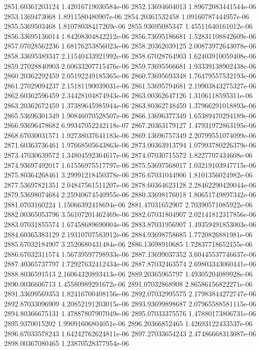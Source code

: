 {2851.60361203124 1.42016719030584e-06
2852.13694604013 1.89672083441544e-06
2853.1369473068 1.8911580480907e-06
2854.20361532458 1.09160787444957e-06
2855.5369503468 1.81078038417269e-06
2855.93695085347 1.45511640161012e-06
2856.33695136014 1.84208304842212e-06
2856.73695186681 1.52831108842609e-06
2857.07028562236 1.68176253856023e-06
2858.20362039125 2.00873972643078e-06
2858.33695389347 2.11540433921992e-06
2858.67028764903 1.62403910059408e-06
2859.27028840903 2.60633207715476e-06
2859.73695566681 1.93339138902438e-06
2860.20362292459 2.05192249185365e-06
2860.73695693348 1.76479557532193e-06
2861.27029094237 2.15181190039031e-06
2861.53695794681 2.19903843275327e-06
2862.60362596459 2.34428104874943e-06
2863.00362647126 1.3106118595311e-06
2863.20362672459 1.37389645985944e-06
2863.80362748459 1.37966291018893e-06
2865.53696301349 1.90846070528507e-06
2866.13696377349 1.65389470294189e-06
2866.93696478682 6.99347052242118e-07
2867.20363179127 1.47931972863195e-06
2868.67030031571 1.92738037641183e-06
2869.13696757349 2.20799551074099e-06
2871.60363736461 1.97668505643863e-06
2873.00363913794 1.07993780226379e-06
2873.47030639572 1.34804592364617e-06
2874.07030715572 1.8227707434608e-06
2874.93697492017 1.61556975517797e-06
2875.53697568017 1.03219103947715e-06
2875.80364268461 3.29991218450378e-06
2876.67031044906 1.8101356024982e-06
2877.53697821351 2.04847561511207e-06
2878.60364623128 2.28462290420044e-06
2879.53698074684 2.25940674540955e-06
2880.33698176018 1.80651749897342e-06
2881.0703160224 1.15066392418694e-06
2881.47031652907 2.70390571085922e-06
2882.00365053796 3.56107201462469e-06
2882.67031804907 2.02141812317856e-06
2883.07031855574 1.67458689690004e-06
2883.87031956907 1.49359491853003e-06
2884.60365383129 2.19310707583912e-06
2884.93698758685 1.7720826881981e-06
2885.67032184907 3.2520680431484e-06
2886.13698910685 1.72837718652155e-06
2886.67032311574 1.56739597798933e-06
2887.13699037352 3.60445537746637e-06
2887.40365737797 1.72927632412434e-06
2887.87032463574 2.69803343060441e-06
2888.8036591513 2.16064320893413e-06
2889.20365965797 1.49305204089928e-06
2890.0036606713 1.45580989291672e-06
2891.07032868908 2.86586156822271e-06
2891.33699569353 1.82416700408156e-06
2892.07032995575 2.17983844272747e-06
2892.87033096909 4.20852191203015e-06
2893.93699898687 2.07965588581115e-06
2894.80366675131 1.47887807907049e-06
2895.07033375576 1.47880173806731e-06
2895.9370015202 1.99091606804051e-06
2896.20366852465 1.42693122433537e-06
2896.67033578243 1.64242762624811e-06
2897.27033654243 2.47486668313087e-06
2898.00367080465 1.23870528377954e-06
}
